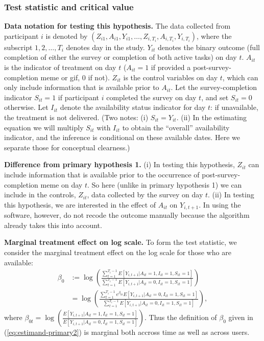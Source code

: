 \documentclass[11pt]{article}
\begin{document}
\subsubsection{Test statistic and critical value}

\textbf{Data notation for testing this hypothesis.} The data collected
from participant $i$ is denoted by $(Z_{i1},A_{i1},Y_{i1},\ldots,Z_{i,T_i},A_{i,T_i},Y_{i,T_i})$,
where the subscript $1,2,\ldots,T_i$ denotes day in the study. $Y_{it}$
denotes the binary outcome (full completion of either the survey or
completion of both active tasks) on day $t$. $A_{it}$ is the indicator
of treatment on day $t$ ($A_{it}=1$ if provided a post-survey-completion
meme or gif, 0 if not). $Z_{it}$ is the control variables on day
$t$, which can only include information that is available prior to
$A_{it}$. Let the survey-completion indicator $S_{it}=1$ if participant
$i$ completed the survey on day $t$, and set $S_{it}=0$ otherwise. Let $I_{it}$ denote the availability status indicator for day $t$: if unavailable, the treatment is not delivered. (Two notes: (i) $S_{it} = Y_{it}$. (ii) In the estimating equation we will multiply $S_{it}$ with $I_{it}$ to obtain the ``overall'' availability indicator, and the inference is conditional on these available dates. Here we separate those for conceptual clearness.)

\textbf{Difference from primary hypothesis 1.} (i) In testing this
hypothesis, $Z_{it}$ can include information that is available prior
to the occurrence of post-survey-completion meme on day $t$. So here
(unlike in primary hypothesis 1) we can include in the controls, $Z_{it}$,
data collected by the survey on day $t$. (ii) In testing this hypothesis,
we are interested in the effect of $A_{it}$ on $Y_{i,t+1}$. In using
the software, however, do not recode the outcome manually because
the algorithm already takes this into account.

\textbf{Marginal treatment effect on log scale. }To form the test
statistic, we consider the marginal treatment effect on the log scale
for those who are available:
\begin{align}
\beta_{0} & :=\log\left(\frac{\sum_{t=1}^{T_i - 1}E[Y_{i,t+1}|A_{it}=1,I_{it}=1, S_{it} = 1]}{\sum_{t=1}^{T_i - 1}E[Y_{i,t+1}|A_{it}=0,I_{it}=1, S_{it} = 1]}\right)\nonumber \\
 & =\log\left(\frac{\sum_{t=1}^{T_i - 1}e^{\beta_{0t}}E[Y_{i,t+1}|A_{it}=0,I_{it}=1, S_{it} = 1]}{\sum_{t=1}^{T_i - 1}E[Y_{i,t+1}|A_{it}=0,I_{it}=1, S_{it} = 1]}\right),\label{eq:estimand-primary2}
\end{align}
where $\beta_{0t}=\log\left(\frac{E[Y_{i,t+1}|A_{it}=1,I_{it}=1, S_{it} = 1]}{E[Y_{i,t+1}|A_{it}=0,I_{it}=1, S_{it} = 1]}\right)$.
Thus the definition of $\beta_{0}$ given in (\ref{eq:estimand-primary2})
is marginal both accross time as well as across users.
\end{document}
